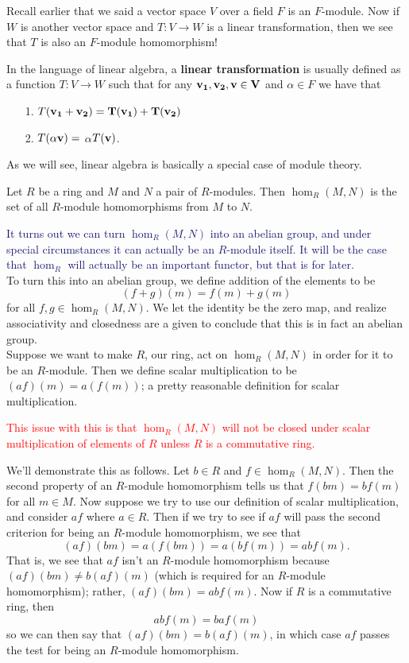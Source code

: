 Recall earlier that we said a vector space $V$ over a field $F$ is
an $F$-module. Now if $W$ is another vector space and $T: V \to W$
is a linear transformation, then we see that $T$ is also an
$F$-module homomorphism! 

In the language of linear algebra, a
\textbf{linear transformation} is usually defined as a function
$T: V \to W$ such that for any $\bf{v}_1, \bf{v}_2, \bf{v} \in V$ and
$\alpha \in F$ we have that 
\begin{itemize}
    \item[1.] $T(\bf{v}_1 + \bf{v}_2) = T(\bf{v}_1) + T(\bf{v}_2)$
    \item[2.] $T(\alpha\bf{v}) = $ $\alpha$$T(\bf{v})$. 
\end{itemize}
As we will see, linear algebra is basically a special case of
module theory. 

\begin{definition}
    Let $R$ be a ring and $M$ and $N$ a pair of $R$-modules. Then
    $\hom_R(M,N)$ is the set of all $R$-module homomorphisms from
    $M$ to $N$. 
\end{definition}

\textcolor{MidnightBlue}{It turns out we can turn $\hom_R(M,N)$
into an abelian group, and under special circumstances it can
actually be an $R$-module itself. It will be the case
that $\hom_R$ will actually be an important functor, but that is
for later.}
\\
\indent To turn this into an abelian group, we define addition of
the elements to be 
\[
    (f + g)(m) = f(m) + g(m)
\]
for all $f, g \in \hom_R(M, N)$. We let the identity be the
zero map, and realize associativity and closedness are a given to
conclude that this is in fact an abelian group. 
\\

Suppose we want to make $R$, our ring, act on $\hom_R(M, N)$ in
order for it to be an $R$-module. Then we define scalar
multiplication to be $(af)(m) = a(f(m))$; a pretty reasonable
definition for scalar multiplication. 

\textcolor{Red}{This issue with this is that $\hom_R(M, N)$ will
not be closed under scalar multiplication of elements of $R$
unless $R$ is a commutative ring.
}

We'll demonstrate this as follows. Let $b \in R$ and
$f \in \hom_R(M, N)$. Then the second property of an $R$-module
homomorphism tells us that $f(bm) = bf(m)$ for all $m \in
M$. Now suppose we try to use our definition of scalar
multiplication, and consider $af$ where $a \in R$. Then if we try
to see if $af$ will pass the second criterion for being an
$R$-module homomorphism, we see that 
\[
    (af)(bm) = a(f(bm)) = a(bf(m)) = abf(m).
\]
That is, we see that $af$ isn't an $R$-module homomorphism because
$(af)(bm) \ne b(af)(m)$ (which is required for an $R$-module homomorphism); rather, $(af)(bm) = abf(m).$ Now if $R$
is a commutative ring, then 
\[
    abf(m) = baf(m)
\]
so we can then say that $(af)(bm) = b(af)(m)$, in which case $af$
passes the test for being an $R$-module homomorphism. 

